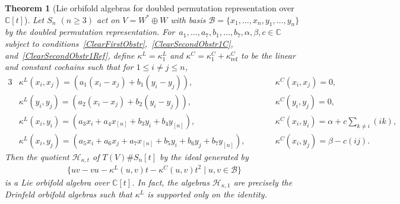 \documentclass[pdftex]{sigma}
\numberwithin{equation}{section}
\newtheorem{Theorem}{Theorem}[section]
\newcommand{\n}[1]{{#1}_{[n]}}
\DeclareMathOperator{\refl}{ref}
\begin{document}
\begin{Theorem}[{Lie orbifold algebras for doubled permutation representation over $\mathbb{C}[t]$}]
\label{Lieorbifold}
Let $S_n$ $(n \geq 3)$ act on $V=W^* \oplus W$ with basis
$\mathcal{B}=\{x_1,\dots,x_n,y_1,\dots,y_n\}$ by the doubled permutation
representation. For~$a_1, \dots, a_7, b_1, \dots, b_7, \alpha, \beta, c \in \mathbb{C}$
subject to conditions~\eqref{ClearFirstObstr},~\eqref{ClearSecondObstr1C}, and~\eqref{ClearSecondObstr1Ref}, define
$\kappa^L=\kappa^L_1$ and $\kappa^C=\kappa^C_1+\kappa^C_{\refl}$ to be the linear and
constant cochains such that for $1\leq i\neq j \leq n$,
\begin{alignat*}{3}
&\kappa^L(x_i,x_j)=(a_1(x_i-x_j)+b_1(y_i-y_j)), \qquad&& \kappa^C(x_i,x_j)=0,& \\
& \kappa^L(y_i,y_j)=(a_2(x_i-x_j)+b_2(y_i-y_j)), \qquad &&\kappa^C(y_i,y_j)=0, &\\
&\kappa^L(x_i,y_i)=(a_3x_i+a_4\n{x}+b_3y_i+b_4\n{y}), \qquad&&
\kappa^C(x_i,y_i)=\alpha+c\sum\limits_{k \neq i} (ik),& \\
&\kappa^L(x_i,y_j)=(a_5x_i+a_6x_j+a_7\n{x}+b_5y_i+b_6y_j+b_7\n{y}) ,\qquad&&
\kappa^C(x_i,y_j)=\beta-c(ij).&
\end{alignat*}
Then the quotient $\mathcal{H}_{\kappa,t}$ of $T(V) \# S_n[t]$ by the ideal generated
by
\begin{gather*}
\big\{uv-vu - \kappa^L(u,v) t -\kappa^C(u,v) t^2 \mid u,v \in \mathcal{B} \big\}
\end{gather*}
is a Lie orbifold algebra over $\mathbb{C}[t]$.
In fact, the algebras $\mathcal{H}_{\kappa,1}$ are precisely the Drinfeld orbifold
algebras such that $\kappa^L$ is supported only on the identity.
\end{Theorem}
\end{document}
